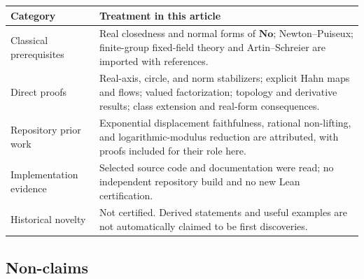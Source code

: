 \documentclass[11pt]{article}
\theoremstyle{definition}
\theoremstyle{remark}
\newcommand{\No}{\mathbf{No}}
\numberwithin{equation}{section}
\begin{document}
\begin{center}
\small
\begin{tabular}{@{}>{\RaggedRight\arraybackslash}p{}>{\RaggedRight\arraybackslash}p{}@{}}
\toprule
Category & Treatment in this article\\
\midrule
Classical prerequisites & Real closedness and normal forms of $\No$;
Newton--Puiseux; finite-group fixed-field theory and Artin--Schreier are
imported with references.\\[3pt]
Direct proofs & Real-axis, circle, and norm stabilizers; explicit Hahn maps
and flows; valued factorization; topology and derivative results;
class extension and real-form consequences.\\[3pt]
Repository prior work & Exponential displacement faithfulness, rational
non-lifting, and logarithmic-modulus reduction are attributed, with proofs
included for their role here.\\[3pt]
Implementation evidence & Selected source code and documentation were read;
no independent repository build and no new Lean certification.\\[3pt]
Historical novelty & Not certified. Derived statements and useful examples
are not automatically claimed to be first discoveries.\\
\bottomrule
\end{tabular}
\end{center}

\subsection{Non-claims}\label{saut:sec:nonclaims}
\end{document}
